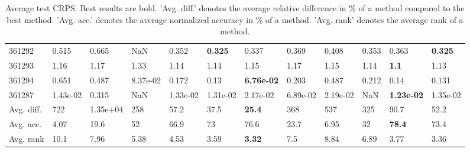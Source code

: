 \begin{table}[ht!]
\begin{tabular}{llllllllllll}
  361292 & 0.515 & 0.665 & NaN & 0.352 & \textbf{0.325} & 0.337 & 0.369 & 0.408 & 0.353 & 0.363 & \textbf{0.325} \\ 
  361293 & 1.16 & 1.17 & 1.33 & 1.14 & 1.14 & 1.15 & 1.17 & 1.15 & 1.14 & \textbf{1.1} & 1.13 \\ 
  361294 & 0.651 & 0.487 & 8.37e-02 & 0.172 & 0.13 & \textbf{6.76e-02} & 0.203 & 0.487 & 0.212 & 0.14 & 0.131 \\ 
  361287 & 1.43e-02 & 0.315 & NaN & 1.33e-02 & 1.31e-02 & 2.17e-02 & 6.89e-02 & 2.19e-02 & NaN & \textbf{1.23e-02} & 1.35e-02 \\ 
   \hline
Avg. diff. & 722 & 1.35e+04 & 258 & 57.2 & 37.5 & \textbf{25.4} & 368 & 537 & 325 & 90.7 & 52.2 \\ 
  Avg. acc. & 4.07 & 19.6 & 52 & 66.9 & 73 & 76.6 & 23.7 & 6.95 & 32 & \textbf{78.4} & 73.4 \\ 
  Avg. rank & 10.1 & 7.96 & 5.38 & 4.53 & 3.59 & \textbf{3.32} & 7.5 & 8.84 & 6.89 & 3.77 & 3.36 \\ 
   \hline
\hline
\end{tabular}
\endgroup
\caption{Average test CRPS. 
                  Best results are bold. 
                  'Avg. diff.' denotes the average relative difference in \% of a method compared to the best method.
                  'Avg. acc.' denotes the average normalized accuracy in \% of a method.
                  'Avg. rank' denotes the average rank of a method.} 
\label{TABLES/table_results_CRPS}
\end{table}
